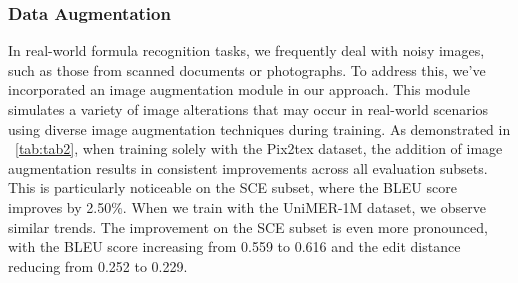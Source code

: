 \documentclass[runningheads]{llncs}
\begin{document}
\begin{table}[t]
 \footnotesize
\centering
\caption{Ablation results on UniMER-Test with models using different augmentations.}

\label{tab:tab2}
\vspace{-5pt}
\end{table}


\vspace{-5pt}
\subsubsection{Data Augmentation} 
In real-world formula recognition tasks, we frequently deal with noisy images, such as those from scanned documents or photographs. To address this, we've incorporated an image augmentation module in our approach. This module simulates a variety of image alterations that may occur in real-world scenarios using diverse image augmentation techniques during training. As demonstrated in ~\cref{tab:tab2}, when training solely with the Pix2tex dataset, the addition of image augmentation results in consistent improvements across all evaluation subsets. This is particularly noticeable on the SCE subset, where the BLEU score improves by 2.50\%. When we train with the UniMER-1M dataset, we observe similar trends. The improvement on the SCE subset is even more pronounced, with the BLEU score increasing from 0.559 to 0.616 and the edit distance reducing from 0.252 to 0.229.
\end{document}
